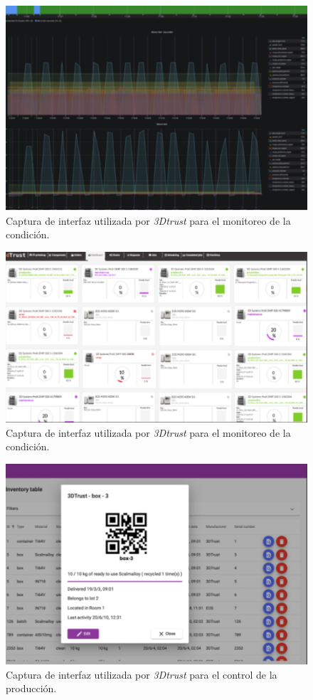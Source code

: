 \begin{figure}[H]
\centering
\includegraphics[scale=1]{images/3dtmonitoreo.png}
\caption{Captura de interfaz utilizada por \textit{3Dtrust} para el monitoreo de la condición.}
\label{3dtmonitoreo}
\end{figure}

\begin{figure}[H]
\centering
\includegraphics[scale=1]{images/3dtmonitoreo2.png}
\caption{Captura de interfaz utilizada por \textit{3Dtrust} para el monitoreo de la condición.}
\label{3dtmonitoreo2}
\end{figure}

\begin{figure}[H]
\centering
\includegraphics[scale=1]{images/3dtmonitoreo3.png}
\caption{Captura de interfaz utilizada por \textit{3Dtrust} para el control de la producción.}
\label{3dtmonitoreo3}
\end{figure}

